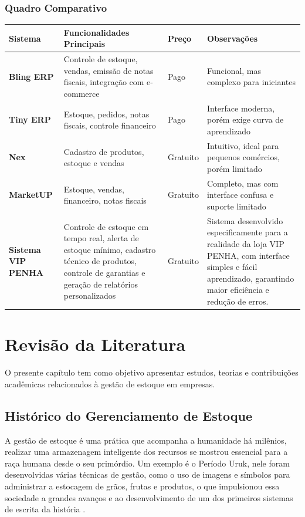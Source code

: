 \documentclass[
	12pt,				%
	openany,			%
	twoside,			%
	a4paper,			%
	english,			%
	brazil				%
	]{abntex2}
\begin{document}
\subsection{Quadro Comparativo}

\begin{quadro}[htb]
\centering
\caption{\label{quadro_comparativo}Comparação entre Sistemas de Gerenciamento de Estoque}
\begin{tabular}{|p{3.2cm}|p{5.5cm}|p{2.2cm}|p{4.1cm}|}
\hline
\textbf{Sistema} & \textbf{Funcionalidades Principais} & \textbf{Preço} & \textbf{Observações} \\
\hline
\textbf{Bling ERP} & Controle de estoque, vendas, emissão de notas fiscais, integração com e-commerce & Pago & Funcional, mas complexo para iniciantes \\
\hline
\textbf{Tiny ERP} & Estoque, pedidos, notas fiscais, controle financeiro & Pago & Interface moderna, porém exige curva de aprendizado \\
\hline
\textbf{Nex} & Cadastro de produtos, estoque e vendas & Gratuito & Intuitivo, ideal para pequenos comércios, porém limitado \\
\hline
\textbf{MarketUP} & Estoque, vendas, financeiro, notas fiscais & Gratuito & Completo, mas com interface confusa e suporte limitado \\
\hline
\textbf{Sistema VIP PENHA} & Controle de estoque em tempo real, alerta de estoque mínimo, cadastro técnico de produtos, controle de garantias e geração de relatórios personalizados & Gratuito & Sistema desenvolvido especificamente para a realidade da loja VIP PENHA, com interface simples e fácil aprendizado, garantindo maior eficiência e redução de erros. \\
\hline
\end{tabular}
\end{quadro}



\chapter{Revisão da Literatura}
O presente capítulo tem como objetivo apresentar estudos, teorias e contribuições acadêmicas relacionados à gestão de estoque em empresas.
\section{Histórico do Gerenciamento de Estoque}
A gestão de estoque é uma prática que acompanha a humanidade há milênios, realizar uma armazenagem inteligente dos recursos se mostrou essencial para a raça humana desde o seu primórdio. Um exemplo é o Período Uruk, nele foram desenvolvidas várias técnicas de gestão, como o uso de imagens e símbolos para administrar a estocagem de grãos, frutas e produtos, o que impulsionou essa sociedade a grandes avanços e ao desenvolvimento de um dos primeiros sistemas de escrita da história \cite{Albright1996}.
\end{document}

